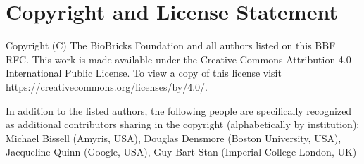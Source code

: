 \section{Copyright and License Statement}


Copyright (C) The BioBricks Foundation and all authors listed on this BBF RFC. This work is made available under the Creative Commons Attribution 4.0 International Public License. To view a copy of this license visit \href{https://creativecommons.org/licenses/by/4.0/}{https://creativecommons.org/licenses/by/4.0/}.

In addition to the listed authors, the following people are specifically recognized as additional contributors sharing in the copyright (alphabetically by institution):
Michael Bissell	(Amyris, USA),
Douglas Densmore (Boston University, USA), 
Jacqueline Quinn (Google, USA),
Guy-Bart Stan (Imperial College London, UK)
